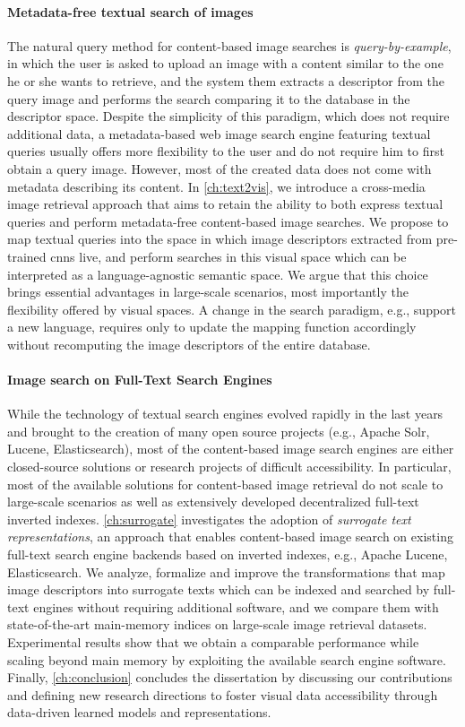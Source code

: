 \paragraph{Metadata-free textual search of images}
The natural query method for content-based image searches is \emph{query-by-example}, in which the user is asked to upload an image with a content similar to the one he or she wants to retrieve, and the system them extracts a descriptor from the query image and performs the search comparing it to the database in the descriptor space.
Despite the simplicity of this paradigm, which does not require additional data, a metadata-based web image search engine featuring textual queries usually offers more flexibility to the user and do not require him to first obtain a query image.
However, most of the created data does not come with metadata describing its content.
In \ref{ch:text2vis}, we introduce a cross-media image retrieval approach that aims to retain the ability to both express textual queries and perform metadata-free content-based image searches.
We propose to map textual queries into the space in which image descriptors extracted from pre-trained \glspl{cnn} live, and perform searches in this visual space which can be interpreted as a language-agnostic semantic space.
We argue that this choice brings essential advantages in large-scale scenarios, most importantly the flexibility offered by visual spaces.
A change in the search paradigm, e.g., support a new language, requires only to update the mapping function accordingly without recomputing the image descriptors of the entire database.

\paragraph{Image search on Full-Text Search Engines}
While the technology of textual search engines evolved rapidly in the last years and brought to the creation of many open source projects (e.g., Apache Solr, Lucene, Elasticsearch), most of the content-based image search engines are either closed-source solutions or research projects of difficult accessibility.
In particular, most of the available solutions for content-based image retrieval do not scale to large-scale scenarios as well as extensively developed decentralized full-text inverted indexes.
\ref{ch:surrogate} investigates the adoption of \emph{surrogate text representations}, an approach that enables content-based image search on existing full-text search engine backends based on inverted indexes, e.g., Apache Lucene, Elasticsearch.
We analyze, formalize and improve the transformations that map image descriptors into surrogate texts which can be indexed and searched by full-text engines without requiring additional software, and we compare them with state-of-the-art main-memory indices on large-scale image retrieval datasets.
Experimental results show that we obtain a comparable performance while scaling beyond main memory by exploiting the available search engine software.\\

Finally, \ref{ch:conclusion} concludes the dissertation by discussing our contributions and defining new research directions to foster visual data accessibility through data-driven learned models and representations.
